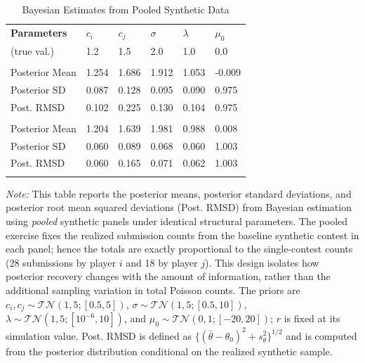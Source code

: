 \documentclass[mnsc]{informs3}
\begin{document}
\begin{table}[htbp]
\centering
\caption{Bayesian Estimates from Pooled Synthetic Data}\label{tbl-pool-synthetic-data}
\begin{tabularx}{\textwidth}{lYYYYY}
\toprule
\textbf{Parameters} & \textbf{$c_i$} & \textbf{$c_j$} & \textbf{$\sigma$} & \textbf{$\lambda$} & \textbf{$\mu_0$}\\
\addlinespace[0.25ex]
\addlinespace[0.25ex]
(true val.)        & 1.2 & 1.5 & 2.0 & 1.0 & 0.0\\
\midrule
\addlinespace
{} \\
Posterior Mean  & 1.254 & 1.686 & 1.912 & 1.053 & -0.009\\
Posterior SD     & 0.087 & 0.128 & 0.095 & 0.090 & 0.975\\
Post. RMSD          & 0.102 & 0.225 & 0.130 & 0.104 & 0.975\\
\addlinespace
{} \\
Posterior Mean  & 1.204 & 1.639 & 1.981 & 0.988 & 0.008\\
Posterior SD     & 0.060 & 0.089 & 0.068 & 0.060 & 1.003\\
Post. RMSD          & 0.060 & 0.165 & 0.071 & 0.062 & 1.003\\
\bottomrule
\addlinespace[0.5ex]
\end{tabularx}
\begin{minipage}{\textwidth}
{\footnotesize
\textit{Note:}
This table reports the posterior means, posterior standard deviations, and posterior root mean squared deviations (Post. RMSD) from Bayesian estimation using \textit{pooled} synthetic panels under identical structural parameters. The pooled exercise fixes the realized submission counts from the baseline synthetic contest in each panel; hence the totals are exactly proportional to the single-contest counts (28 submissions by player $i$ and 18 by player $j$). This design isolates how posterior recovery changes with the amount of information, rather than the additional sampling variation in total Poisson counts.
The priors are $c_i,c_j\sim\mathcal{TN}(1,5;[0.5,5])$, $\sigma\sim\mathcal{TN}(1,5;[0.5,10])$, $\lambda\sim\mathcal{TN}(1,5;[10^{-6},10])$, and $\mu_0\sim\mathcal{TN}(0,1;[-20,20])$; $r$ is fixed at its simulation value.
Post. RMSD is defined as $\{(\bar{\theta}-\theta_0)^2+s_\theta^2\}^{1/2}$ and is computed from the posterior distribution conditional on the realized synthetic sample.
}
\end{minipage}
\end{table}
\end{document}
